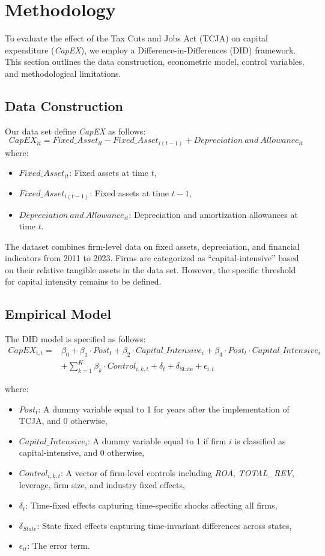 \documentclass[11pt]{article}
\begin{document}
\section{Methodology}
To evaluate the effect of the Tax Cuts and Jobs Act (TCJA) on capital expenditure (\textit{CapEX}), we employ a Difference-in-Differences (DID) framework. This section outlines the data construction, econometric model, control variables, and methodological limitations.
\subsection{Data Construction}
Our data set define \textit{CapEX} as follows:
\[
CapEX_{it} = Fixed\_Asset_{it} - Fixed\_Asset_{i(t-1)} + Depreciation\ and\ Allowance_{it}
\]
where:
\begin{itemize}
    \item \(Fixed\_Asset_{it}\): Fixed assets at time \(t\),
    \item \(Fixed\_Asset_{i(t-1)}\): Fixed assets at time \(t-1\),
    \item \(Depreciation\ and\ Allowance_{it}\): Depreciation and amortization allowances at time \(t\).
\end{itemize}

The dataset combines firm-level data on fixed assets, depreciation, and financial indicators from 2011 to 2023. Firms are categorized as “capital-intensive” based on their relative tangible assets in the data set. However, the specific threshold for capital intensity remains to be defined.

\subsection{Empirical Model}
The DID model is specified as follows:
\begin{align}
CapEX_{i,t} ={} & \beta_0 + \beta_1 \cdot Post_t + \beta_2 \cdot Capital\_Intensive_i + \beta_3 \cdot Post_t \cdot Capital\_Intensive_i \nonumber \\
                & + \sum_{k=1}^K \beta_k \cdot Control_{i,k,t} + \delta_t + \delta_{\text{State}} + \epsilon_{i,t}
\end{align}

where:
\begin{itemize}
    \item \(Post_t\): A dummy variable equal to 1 for years after the implementation of TCJA, and 0 otherwise,
    \item \(Capital\_Intensive_i\): A dummy variable equal to 1 if firm \(i\) is classified as capital-intensive, and 0 otherwise,
    \item \(Control_{i,k,t}\): A vector of firm-level controls including \textit{ROA}, \textit{TOTAL\_REV}, leverage, firm size, and industry fixed effects,
    \item \(\delta_t\): Time-fixed effects capturing time-specific shocks affecting all firms,
    \item \(\delta_{State}\): State fixed effects capturing time-invariant differences across states,
    \item \(\epsilon_{it}\): The error term.
\end{itemize}
\end{document}
